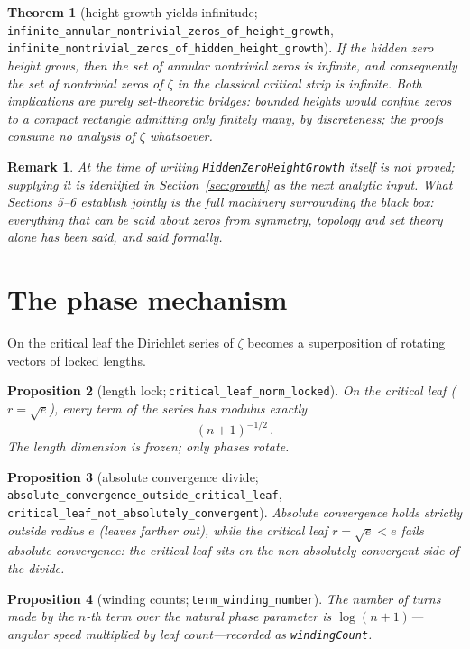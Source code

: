 \documentclass[submission]{jsfds}
\newtheorem{theorem}{Theorem}
\newtheorem{proposition}[theorem]{Proposition}
\newtheorem*{remark}{Remark}
\newcommand{\Lean}[1]{\texttt{#1}}
\begin{document}
\begin{theorem}[height growth yields infinitude;\,
\Lean{infinite_annular_nontrivial_zeros_of_height_growth},
\Lean{infinite_nontrivial_zeros_of_hidden_height_growth}]
\label{thm:heightgrowth}
If the hidden zero height grows, then the set of annular nontrivial zeros is
infinite, and consequently the set of nontrivial zeros of $\zeta$ in the
classical critical strip is infinite. Both implications are purely
set-theoretic bridges: bounded heights would confine zeros to a compact
rectangle admitting only finitely many, by discreteness; the proofs consume no
analysis of $\zeta$ whatsoever.
\end{theorem}

\begin{remark}
At the time of writing \Lean{HiddenZeroHeightGrowth} itself is \emph{not}
proved; supplying it is identified in Section~\ref{sec:growth} as the next
analytic input. What Sections 5--6 establish jointly is the full machinery
surrounding the black box: everything that can be said about zeros from
symmetry, topology and set theory alone has been said, and said formally.
\end{remark}

\section{The phase mechanism}\label{sec:phase}

On the critical leaf the Dirichlet series of $\zeta$ becomes a superposition of
rotating vectors of locked lengths.

\begin{proposition}[length lock;\,\Lean{critical_leaf_norm_locked}]
\label{prop:lock}
On the critical leaf ($r=\sqrt{e}$), every term of the series has modulus
exactly
\[
  (n+1)^{-1/2}\, .
\]
The length dimension is frozen; only phases rotate.
\end{proposition}

\begin{proposition}[absolute convergence divide;\,
\Lean{absolute_convergence_outside_critical_leaf},
\Lean{critical_leaf_not_absolutely_convergent}]\label{prop:convdiv}
Absolute convergence holds strictly outside radius $e$ (leaves farther out),
while the critical leaf $r=\sqrt{e}<e$ fails absolute convergence: the critical
leaf sits on the non-absolutely-convergent side of the divide.
\end{proposition}

\begin{proposition}[winding counts;\,\Lean{term_winding_number}]
\label{prop:windingcount}
The number of turns made by the $n$-th term over the natural phase parameter is
$\log(n+1)$---angular speed multiplied by leaf count---recorded as
\Lean{windingCount}.
\end{proposition}
\end{document}
